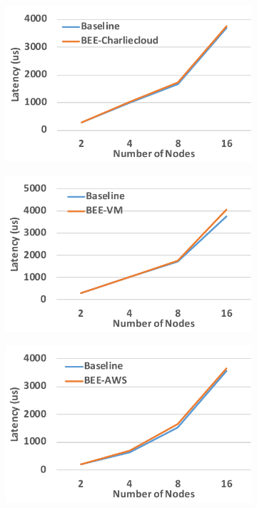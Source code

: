\begin{figure}[t]
    \centering
    \begin{subfigure}[t]{0.245\textwidth}
        \includegraphics[width=\textwidth]{figures/cl-bee-cc.pdf}
    \end{subfigure}
    \begin{subfigure}[t]{0.245\textwidth}
        \includegraphics[width=\textwidth]{figures/cl-bee-vm.pdf}
    \end{subfigure}
    \begin{subfigure}[t]{0.245\textwidth}
        \includegraphics[width=\textwidth]{figures/cl-bee-aws.pdf}

\end{subfigure}
\end{figure}
